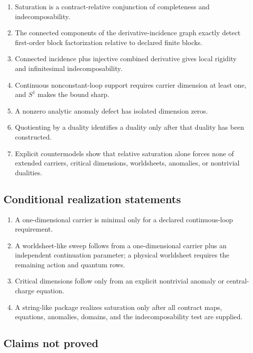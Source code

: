 \documentclass[11pt]{article}
\begin{document}
\begin{enumerate}
\item Saturation is a contract-relative conjunction of completeness and
indecomposability.
\item The connected components of the derivative-incidence graph exactly
detect first-order block factorization relative to declared finite blocks.
\item Connected incidence plus injective combined derivative gives local
rigidity and infinitesimal indecomposability.
\item Continuous nonconstant-loop support requires carrier dimension at least
one, and $S^1$ makes the bound sharp.
\item A nonzero analytic anomaly defect has isolated dimension zeros.
\item Quotienting by a duality identifies a duality only after that duality has
been constructed.
\item Explicit countermodels show that relative saturation alone forces none
of extended carriers, critical dimensions, worldsheets, anomalies, or
nontrivial dualities.
\end{enumerate}

\subsection{Conditional realization statements}

\begin{enumerate}
\item A one-dimensional carrier is minimal only for a declared continuous-loop
requirement.
\item A worldsheet-like sweep follows from a one-dimensional carrier plus an
independent continuation parameter; a physical worldsheet requires the
remaining action and quantum rows.
\item Critical dimensions follow only from an explicit nontrivial anomaly or
central-charge equation.
\item A string-like package realizes saturation only after all contract maps,
equations, anomalies, domains, and the indecomposability test are supplied.
\end{enumerate}

\subsection{Claims not proved}
\end{document}
